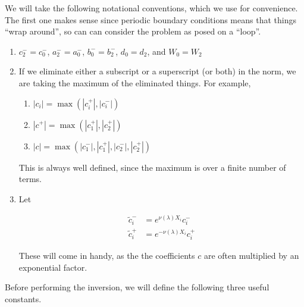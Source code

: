 \documentclass[12pt]{article}
\begin{document}
We will take the following notational conventions, which we use for convenience. The first one makes sense since periodic boundary conditions means that things ``wrap around'', so can can consider the problem as posed on a ``loop''.

\begin{enumerate}
\item $c_2^- = c_0^-$, $a_2^- = a_0^-$, $b_0^- = b_2^-$, $d_0 = d_2$, and $W_0 = W_2$

\item If we eliminate either a subscript or a superscript (or both) in the norm, we are taking the maximum of the eliminated things. For example,
	\begin{enumerate}
		\item $|c_i| = \max(|c_i^+|, |c_i^-|)$ 
		\item $|c^+| = \max(|c_1^+|, |c_2^+|)$
		\item $|c| = \max(|c_1^-|, |c_1^+|, |c_2^-|, |c_2^+|)$
	\end{enumerate}
	This is always well defined, since the maximum is over a finite number of terms.
\item Let

\begin{align*}
\tilde{c}_i^- &= e^{\nu(\lambda)X_i} c_i^- \\
\tilde{c}_i^+ &= e^{-\nu(\lambda)X_i} c_i^+
\end{align*}

These will come in handy, as the the coefficients $c$ are often multiplied by an exponential factor.\\

\end{enumerate}

Before performing the inversion, we will define the following three useful constants.
\end{document}
